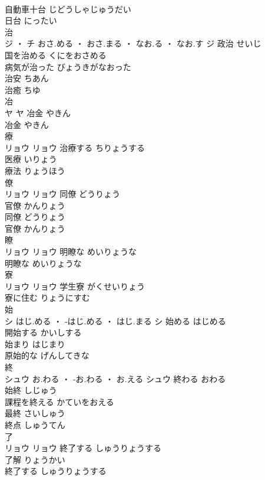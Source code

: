 \documentclass[8pt]{extreport}
\begin{document}
\begin{CJK}{UTF8}{min}
\\	自動車十台	じどうしゃじゅうだい	
\\	日台	にったい	
\\	治	
\\	ジ ・ チ	おさ.める ・ おさ.まる ・ なお.る ・ なお.す	ジ	政治	せいじ	
\\	国を治める	くにをおさめる	
\\	病気が治った	びょうきがなおった	
\\	治安	ちあん	
\\	治癒	ちゆ	
\\	冶	
\\	ヤ		ヤ	冶金	やきん	
\\	冶金	やきん	
\\	療	
\\	リョウ		リョウ	治療する	ちりょうする	
\\	医療	いりょう	
\\	療法	りょうほう	
\\	僚	
\\	リョウ		リョウ	同僚	どうりょう	
\\	官僚	かんりょう	
\\	同僚	どうりょう	
\\	官僚	かんりょう	
\\	瞭	
\\	リョウ		リョウ	明瞭な	めいりょうな	
\\	明瞭な	めいりょうな	
\\	寮	
\\	リョウ		リョウ	学生寮	がくせいりょう	
\\	寮に住む	りょうにすむ	
\\	始	
\\	シ	はじ.める ・ -はじ.める ・ はじ.まる	シ	始める	はじめる	
\\	開始する	かいしする	
\\	始まり	はじまり	
\\	原始的な	げんしてきな	
\\	終	
\\	シュウ	お.わる ・ -お.わる ・ お.える	シュウ	終わる	おわる	
\\	始終	しじゅう	
\\	課程を終える	かていをおえる	
\\	最終	さいしゅう	
\\	終点	しゅうてん	
\\	了	
\\	リョウ		リョウ	終了する	しゅうりょうする	
\\	了解	りょうかい	
\\	終了する	しゅうりょうする	

\end{CJK}
\end{document}
